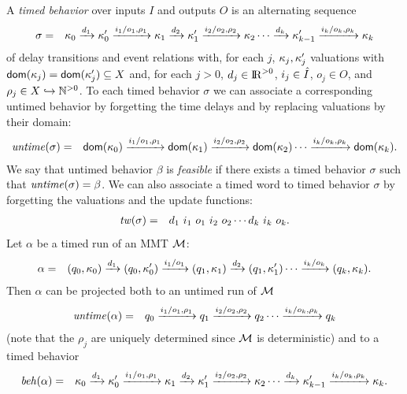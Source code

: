 A \emph{timed behavior} over inputs $I$ and outputs $O$ is an alternating sequence
\begin{eqnarray}
\label{timedbehavior}
\sigma & = & \kappa_0 \xrightarrow{d_1} \kappa'_0 \xrightarrow{i_1/o_1, \rho_1} \kappa_1 \xrightarrow{d_2} \kappa'_1 \xrightarrow{i_2/o_2, \rho_2} \kappa_2 \cdots
\xrightarrow{d_k} \kappa'_{k-1} \xrightarrow{i_k/o_k, \rho_k} \kappa_{k}
\end{eqnarray}
of delay transitions and event relations with, for each $j$,
$\kappa_j, \kappa'_j$ valuations
with ${\textsf{dom}}(\kappa_j) = {\textsf{dom}}(\kappa'_j) \subseteq X$ and,
for each $j>0$,  $d_j \in {\rm I\!R}^{> 0}$, $i_j \in \hat{I}$, $o_j \in O$, and $\rho_j \in X \hookrightarrow {\mathbb N}^{>0}$.
To each timed behavior $\sigma$ we can associate a corresponding untimed behavior by forgetting the time
delays and by replacing valuations by their domain:
\begin{eqnarray*}
\mathit{untime}(\sigma) & = & {\textsf{dom}}(\kappa_0) \xrightarrow{i_1/o_1, \rho_1} {\textsf{dom}}(\kappa_1)  \xrightarrow{i_2/o_2, \rho_2} {\textsf{dom}}(\kappa_2) \cdots \xrightarrow{i_k/o_k, \rho_k} {\textsf{dom}}(\kappa_k).
\end{eqnarray*}
We say that untimed behavior $\beta$ is \emph{feasible} if there exists a timed behavior $\sigma$ such that $\mathit{untime}(\sigma) = \beta$.
We can also associate a timed word to timed behavior $\sigma$ by forgetting the valuations and the update functions:
\begin{eqnarray*}
\mathit{tw}(\sigma) & = & d_ 1 ~ i_1 ~ o_1 ~ i_2 ~ o_2 \cdots d_k ~ i_k ~ o_k.
\end{eqnarray*} 
Let $\alpha$ be a timed run of an MMT ${\cal M}$: 
\begin{eqnarray*}
\alpha & = & (q_0, \kappa_0) \xrightarrow{d_1} (q_0, \kappa'_0) \xrightarrow{i_1/o_1} (q_1, \kappa_1) \xrightarrow{d_2} (q_1, \kappa'_1)  \cdots
 \xrightarrow{i_k/o_k} (q_k, \kappa_k).
\end{eqnarray*}
Then $\alpha$ can be projected both to an untimed run of ${\cal M}$
\begin{eqnarray*}
\mathit{untime} (\alpha) & = & q_0 \xrightarrow{i_1/o_1, \rho_1} q_1  \xrightarrow{i_2/o_2, \rho_2} q_2 \cdots \xrightarrow{i_k/o_k, \rho_k} q_k
\end{eqnarray*}
(note that the $\rho_j$ are uniquely determined since ${\cal M}$ is deterministic) and to a timed behavior
\begin{eqnarray*}
\mathit{beh}(\alpha) & = & \kappa_0 \xrightarrow{d_1} \kappa'_0 \xrightarrow{i_1/o_1, \rho_1} \kappa_1 \xrightarrow{d_2} \kappa'_1 \xrightarrow{i_2/o_2, \rho_2} \kappa_2 \cdots
\xrightarrow{d_k} \kappa'_{k-1} \xrightarrow{i_k/o_k, \rho_k} \kappa_{k}.
\end{eqnarray*}
